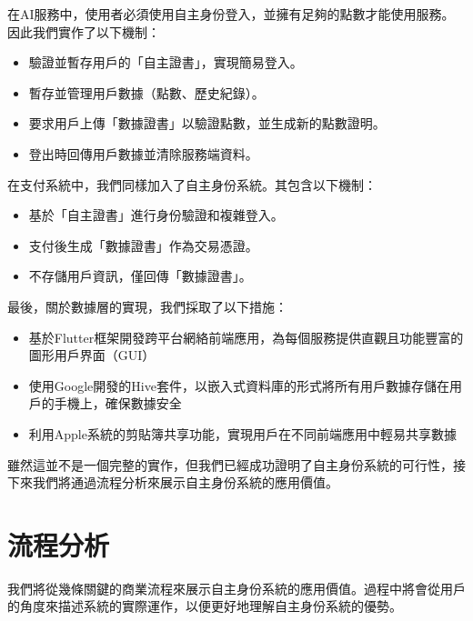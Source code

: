 在AI服務中，使用者必須使用自主身份登入，並擁有足夠的點數才能使用服務。因此我們實作了以下機制：
\begin{itemize}
  \item 驗證並暫存用戶的「自主證書」，實現簡易登入。
  \item 暫存並管理用戶數據（點數、歷史紀錄）。
  \item 要求用戶上傳「數據證書」以驗證點數，並生成新的點數證明。
  \item 登出時回傳用戶數據並清除服務端資料。
\end{itemize}
在支付系統中，我們同樣加入了自主身份系統。其包含以下機制：
\begin{itemize}
  \item 基於「自主證書」進行身份驗證和複雜登入。
  \item 支付後生成「數據證書」作為交易憑證。
  \item 不存儲用戶資訊，僅回傳「數據證書」。
\end{itemize}
最後，關於數據層的實現，我們採取了以下措施：
\begin{itemize}
  \item 基於Flutter框架開發跨平台網絡前端應用，為每個服務提供直觀且功能豐富的圖形用戶界面（GUI）
  \item 使用Google開發的Hive套件，以嵌入式資料庫的形式將所有用戶數據存儲在用戶的手機上，確保數據安全
  \item 利用Apple系統的剪貼簿共享功能，實現用戶在不同前端應用中輕易共享數據
\end{itemize}
雖然這並不是一個完整的實作，但我們已經成功證明了自主身份系統的可行性，接下來我們將通過流程分析來展示自主身份系統的應用價值。
\section{流程分析}
我們將從幾條關鍵的商業流程來展示自主身份系統的應用價值。過程中將會從用戶的角度來描述系統的實際運作，以便更好地理解自主身份系統的優勢。
